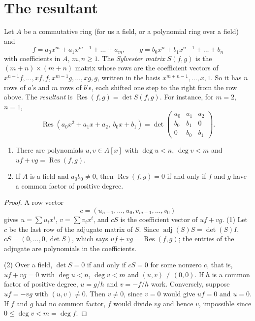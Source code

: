 \section{The resultant}

Let $A$ be a commutative ring (for us a field, or a polynomial ring over a field) and
\[
f=a_0x^m+a_1x^{m-1}+\dots+a_m,\qquad g=b_0x^n+b_1x^{n-1}+\dots+b_n
\]
with coefficients in $A$, $m,n\ge1$. The \emph{Sylvester matrix} $S(f,g)$ is the $(m+n)\times(m+n)$ matrix whose rows are the coefficient vectors of
$x^{n-1}f,\dots,xf,f,x^{m-1}g,\dots,xg,g$, written in the basis $x^{m+n-1},\dots,x,1$. So it has $n$ rows of $a$'s and $m$ rows of $b$'s, each shifted one
step to the right from the row above. The \emph{resultant} is $\operatorname{Res}(f,g)=\det S(f,g)$. For instance, for $m=2$, $n=1$,
\[
\operatorname{Res}(a_0x^2+a_1x+a_2,\ b_0x+b_1)=\det\begin{pmatrix}a_0&a_1&a_2\\b_0&b_1&0\\0&b_0&b_1\end{pmatrix}.
\]

\begin{proposition}\label{prop:resultant}
\begin{enumerate}
\item There are polynomials $u,v\in A[x]$ with $\deg u<n$, $\deg v<m$ and $uf+vg=\operatorname{Res}(f,g)$.
\item If $A$ is a field and $a_0b_0\ne0$, then $\operatorname{Res}(f,g)=0$ if and only if $f$ and $g$ have a common factor of positive degree.
\end{enumerate}
\end{proposition}

\begin{proof}
A row vector
\[
c=(u_{n-1},\dots,u_0,v_{m-1},\dots,v_0)
\]
gives $u=\sum u_ix^i$, $v=\sum v_ix^i$, and $cS$ is the coefficient vector of $uf+vg$. (1) Let
$c$ be the last row of the adjugate matrix of $S$. Since $\operatorname{adj}(S)S=\det(S)I$, $cS=(0,\dots,0,\det S)$, which says
$uf+vg=\operatorname{Res}(f,g)$; the entries of the adjugate are polynomials in the coefficients.

(2) Over a field, $\det S=0$ if and only if $cS=0$ for some nonzero $c$, that is, $uf+vg=0$ with $\deg u<n$, $\deg v<m$ and $(u,v)\ne(0,0)$. If $h$ is
a common factor of positive degree, $u=g/h$ and $v=-f/h$ work. Conversely, suppose $uf=-vg$ with $(u,v)\ne0$. Then $v\ne0$, since $v=0$ would give
$uf=0$ and $u=0$. If $f$ and $g$ had no common factor, $f$ would divide $vg$ and hence $v$, impossible since $0\le\deg v<m=\deg f$.
\end{proof}

